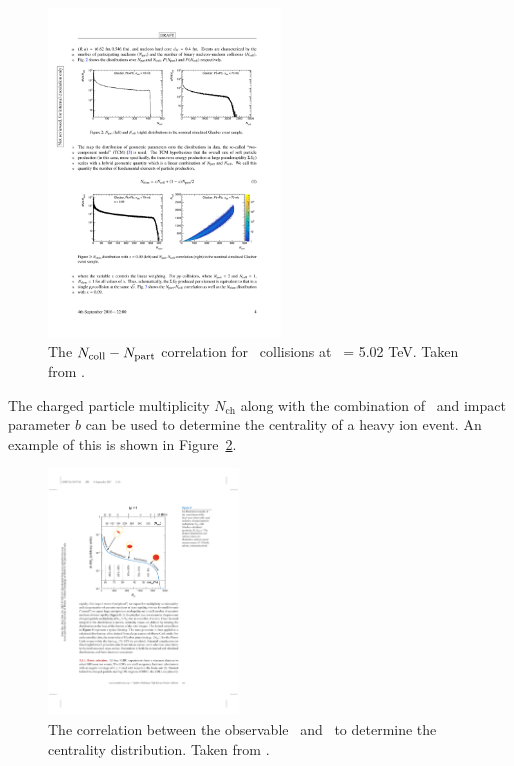 \begin{figure}[htbp]
\begin{center}
\includegraphics[width=0.55\textwidth]{figures/theory/NcollNpart}
\caption{The $\mbox{$N_{\mathrm{coll}}$}-\mbox{$N_{\mathrm{part}}$}$ correlation for \pbpb\ collisions at \sqrtsnn\ = 5.02 TeV.
Taken from \cite{Perepelitsa:2212936}.}
\label{fig:NcollNpart}
\end{center}
\end{figure}

The charged particle multiplicity $N_{\mathrm{ch}}$ along with the combination of \Npart\ and impact parameter $b$ can be used to determine the centrality of a heavy ion event.
An example of this is shown in Figure~\ref{fig:cent_estimate}.

\begin{figure}[htbp]
\begin{center}
\includegraphics[width=0.45\textwidth]{figures/theory/cent_estimate}
\caption{The correlation between the observable \Nch\ and \Npart\ to determine the centrality distribution.
Taken from \cite{doi:10.1146/annurev.nucl.57.090506.123020}.}
\label{fig:cent_estimate}
\end{center}
\end{figure}






